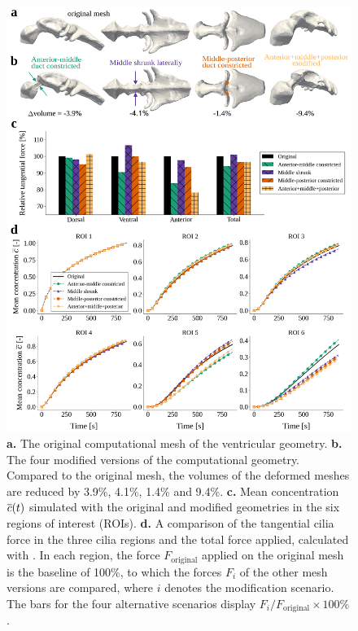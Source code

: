 \documentclass{WileyMSP-template}
\begin{document}
\begin{figure}
    \centering
    \includegraphics[width=\textwidth]{graphics/figure6_compare_modified_geometries.png}
    \caption{\textbf{a.} The original computational mesh of the ventricular geometry.
    \textbf{b.} The four modified versions of the computational geometry. Compared
    to the original mesh, the volumes of the deformed meshes are reduced by 3.9\%, 4.1\%, 1.4\% 
    and 9.4\%.
    \textbf{c.} Mean concentration $\overline{c}(t)$ simulated with the original and modified geometries
    in the six regions of interest (ROIs).
    \textbf{d.} A comparison of the tangential cilia force in the three cilia regions
    and the total force applied, calculated with .
    In each region, the force $F_{\mathrm{original}}$ 
    applied on the original mesh is the baseline of 100\%,
    to which the forces $F_i$ of the other mesh versions are compared, where $i$ denotes
    the modification scenario.
    The bars for the four alternative scenarios display $F_i/F_{\mathrm{original}}\times 100\%$.}
    \label{fig:fig6}
\end{figure}
\end{document}
